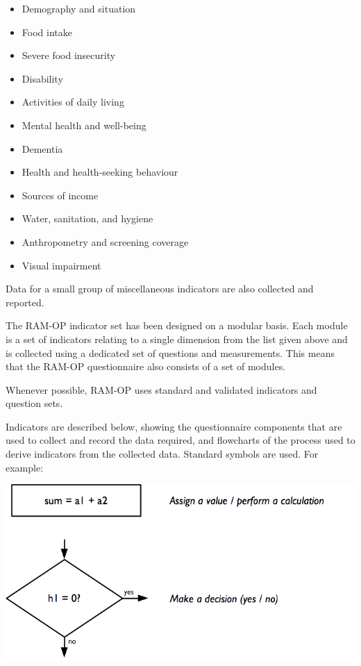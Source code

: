 \documentclass[12pt,a4paper]{book}
\providecommand{\tightlist}{%
  \setlength{\itemsep}{0pt}\setlength{\parskip}{0pt}}
\theoremstyle{definition}
\theoremstyle{definition}
\theoremstyle{definition}
\theoremstyle{remark}
\begin{document}
\begin{itemize}
\tightlist
\item
  Demography and situation
\item
  Food intake
\item
  Severe food insecurity
\item
  Disability
\item
  Activities of daily living
\item
  Mental health and well-being
\item
  Dementia
\item
  Health and health-seeking behaviour
\item
  Sources of income
\item
  Water, sanitation, and hygiene
\item
  Anthropometry and screening coverage
\item
  Visual impairment
\end{itemize}

Data for a small group of miscellaneous indicators are also collected
and reported.

The RAM-OP indicator set has been designed on a modular basis. Each
module is a set of indicators relating to a single dimension from the
list given above and is collected using a dedicated set of questions and
measurements. This means that the RAM-OP questionnaire also consists of
a set of modules.

Whenever possible, RAM-OP uses standard and validated indicators and
question sets.

Indicators are described below, showing the questionnaire components
that are used to collect and record the data required, and flowcharts of
the process used to derive indicators from the collected data. Standard
symbols are used. For example:

\begin{center}\includegraphics{figures/indicators01} \end{center}
\end{document}
